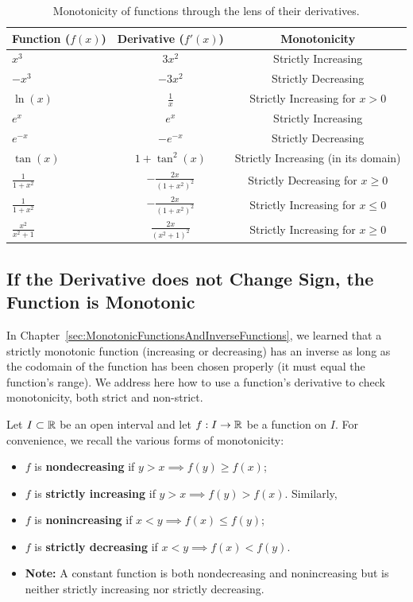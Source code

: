 \begin{table}[ht]
\centering
\begin{tabular}{lcc}
\toprule
Function ($f(x)$) & Derivative ($f'(x)$) & Monotonicity \\
\midrule
$x^3$ & $3x^2$ & Strictly Increasing \\
$-x^3$ & $-3x^2$ & Strictly Decreasing \\
$\ln(x)$ & $\frac{1}{x}$ & Strictly Increasing for $x > 0$ \\
$e^x$ & $e^x$ & Strictly Increasing \\
$e^{-x}$ & $-e^{-x}$ & Strictly Decreasing \\
$\tan(x)$ & $1 + \tan^2(x)$ & Strictly Increasing (in its domain) \\
$\frac{1}{1 + x^2}$ & $-\frac{2x}{(1+x^2)^2}$ & Strictly Decreasing for $x \ge  0$ \\
\addlinespace
$\frac{1}{1 + x^2}$ & $-\frac{2x}{(1+x^2)^2}$ & Strictly Increasing for $x \leq 0$ \\
\addlinespace
$\frac{x^2}{x^2 + 1}$ & $\frac{2x}{(x^2+1)^2}$ & Strictly Increasing for $x \ge  0$\\
\bottomrule
\end{tabular}
\caption{Monotonicity of functions through the lens of their derivatives.}
\label{tab:Monotonicity}
\end{table}

\subsection{If the Derivative does not Change Sign, the Function is Monotonic}
\label{sec:DerivativeAndMonotonicity}

In Chapter~\ref{sec:MonotonicFunctionsAndInverseFunctions}, we learned that a strictly monotonic function (increasing or decreasing) has an inverse as long as the codomain of the function has been chosen properly (it must equal the function's range). We address here how to use a function's derivative to check monotonicity, both strict and non-strict.

Let $I \subset \mathbb R$ be an open interval and let $f:I \to \mathbb R$ be a function on $I$. For convenience, we recall the various forms of monotonicity:
\begin{itemize}
    \item $f$ is \textbf{nondecreasing} if $y > x \implies f(y) \ge f(x)$;
    \item $f$ is \textbf{strictly increasing} if $y > x \implies f(y) > f(x)$. Similarly, 
    \item $f$ is \textbf{nonincreasing} if $x < y\implies f(x) \le f(y)$;
    \item $f$ is \textbf{strictly decreasing} if $x < y\implies f(x) < f(y)$. 
    \item \textbf{Note:} A constant function is both nondecreasing and nonincreasing but is neither strictly increasing nor strictly decreasing.     
\end{itemize}

